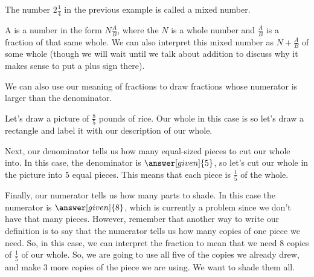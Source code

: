 \documentclass{ximera}
\begin{document}
The number $2 \frac{1}{4}$ in the previous example is called a mixed number.
\begin{definition}
A  is a number in the form $N \frac{A}{B}$, where the $N$ is a whole number and $\frac{A}{B}$ is a fraction of that same whole. We can also interpret this mixed number as $N + \frac{A}{B}$ of some whole (though we will wait until we talk about addition to discuss why it makes sense to put a plus sign there).
\end{definition}


We can also use our meaning of fractions to draw fractions whose numerator is larger than the denominator.

\begin{example}
Let's draw a picture of $\frac{8}{5}$ pounds of rice. Our whole in this case is  so let's draw a rectangle and label it with our description of our whole.

\begin{image} \end{image}

Next, our denominator tells us how many equal-sized pieces to cut our whole into. In this case, the denominator is $\answer[given]{5}$, so let's cut our whole in the picture into $5$ equal pieces. This means that each piece is $\frac{1}{5}$ of the whole.

\begin{image} \end{image}

Finally, our numerator tells us how many parts to shade. In this case the numerator is $\answer[given]{8}$, which is currently a problem since we don't have that many pieces. However, remember that another way to write our definition is to say that the numerator tells us how many copies of one piece we need. So, in this case, we can interpret the fraction to mean that we need $8$ copies of $\frac{1}{5}$ of our whole. So, we are going to use all five of the copies we already drew, and make 3 more copies of the piece we are using. We want to shade them all.


\end{example}
\end{document}
